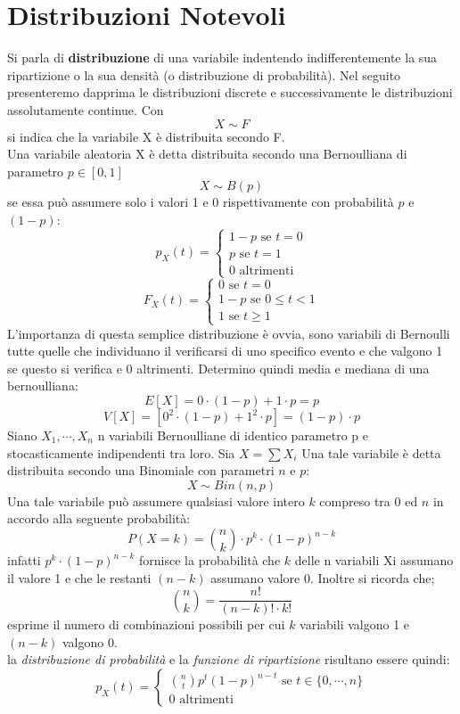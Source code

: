 \documentclass[a4paper,12pt, oneside]{book}
\begin{document}
\chapter{Distribuzioni Notevoli}
Si parla di \textbf{distribuzione} di una variabile indentendo indifferentemente la sua ripartizione o la sua densità (o distribuzione di
probabilità). Nel seguito presenteremo dapprima le distribuzioni discrete e successivamente le distribuzioni assolutamente continue. Con 
\[X\sim F\]
si indica che la variabile X è distribuita secondo F.\\
Una variabile aleatoria X è detta distribuita secondo una Bernoulliana di parametro $p\in[0,1]$
\[X\sim B(p)\]
se  essa può assumere solo i valori 1 e 0 rispettivamente con probabilità $p$ e $(1-p)$:
\[p_X(t)=\begin{cases}
1-p\mbox{ se } t=0\\
p \mbox{ se } t=1\\
0 \mbox{ altrimenti} 
\end{cases}\]
\[F_X(t)=\begin{cases}
0\mbox{ se } t=0\\
1-p \mbox{ se } 0\leq t<1\\
1 \mbox{ se } t\geq 1 
\end{cases}\]
L’importanza di questa semplice distribuzione è ovvia, sono variabili di Bernoulli tutte quelle che individuano il verificarsi di uno specifico evento e che valgono 1 se questo si verifica e 0 altrimenti. Determino quindi media e mediana di una bernoulliana:
\[E[X]=0\cdot (1-p)+1\cdot p= p\]
\[V[X]=[0^2\cdot(1-p)+1^2\cdot p]=(1-p)\cdot p\]
Siano $X_1,\cdots, X_n$ n variabili Bernoulliane di identico parametro p e stocasticamente indipendenti tra loro. Sia $X=\sum X_i$ Una tale variabile è detta distribuita secondo una Binomiale con parametri $n$ e $p$:
\[X\sim Bin(n,p)\]
Una tale variabile può assumere qualsiasi valore intero $k$ compreso tra 0 ed $n$ in accordo alla seguente probabilità:
\[P(X=k)=\binom{n}{k}\cdot p^k\cdot (1-p)^{n-k}\]
infatti $p^k\cdot (1-p)^{n-k}$ fornisce la probabilità che $k$ delle n variabili Xi assumano il valore 1 e che le restanti
$(n-k)$ assumano valore 0. Inoltre si ricorda che;
\[\binom{n}{k}=\frac{n!}{(n-k)!\cdot k!}\]
esprime il numero di combinazioni possibili per cui $k$ variabili valgono 1 e $(n-k)$ valgono 0.\\
la \textit{distribuzione di probabilità} e la \textit{funzione di ripartizione} risultano essere quindi:
\[p_X(t)=\begin{cases}
\binom{n}{t}p^t(1-p)^{n-t} \mbox{ se } t\in\{0,\cdots, n\}\\
0 \mbox{ altrimenti } 
\end{cases}\]
\end{document}

